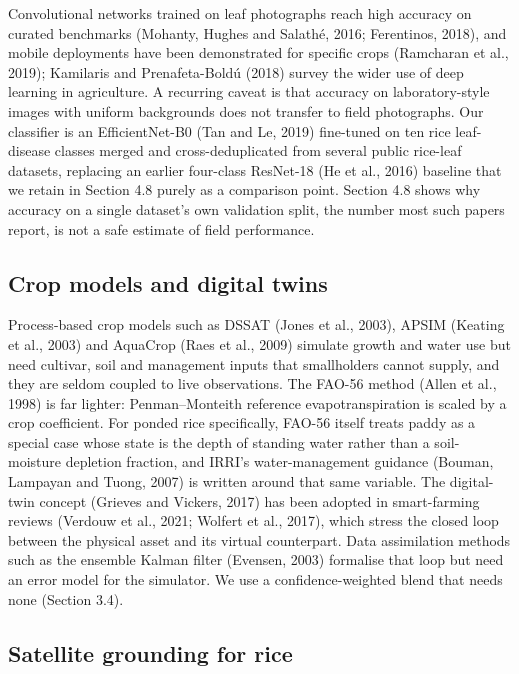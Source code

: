 \documentclass[11pt,a4paper]{article}
\begin{document}
Convolutional networks trained on leaf photographs reach high accuracy on curated benchmarks (Mohanty, Hughes and Salathé, 2016; Ferentinos, 2018), and mobile deployments have been demonstrated for specific crops (Ramcharan et al., 2019); Kamilaris and Prenafeta-Boldú (2018) survey the wider use of deep learning in agriculture. A recurring caveat is that accuracy on laboratory-style images with uniform backgrounds does not transfer to field photographs. Our classifier is an EfficientNet-B0 (Tan and Le, 2019) fine-tuned on ten rice leaf-disease classes merged and cross-deduplicated from several public rice-leaf datasets, replacing an earlier four-class ResNet-18 (He et al., 2016) baseline that we retain in Section 4.8 purely as a comparison point. Section 4.8 shows why accuracy on a single dataset's own validation split, the number most such papers report, is not a safe estimate of field performance.

\subsection{Crop models and digital twins}

Process-based crop models such as DSSAT (Jones et al., 2003), APSIM (Keating et al., 2003) and AquaCrop (Raes et al., 2009) simulate growth and water use but need cultivar, soil and management inputs that smallholders cannot supply, and they are seldom coupled to live observations. The FAO-56 method (Allen et al., 1998) is far lighter: Penman--Monteith reference evapotranspiration is scaled by a crop coefficient. For ponded rice specifically, FAO-56 itself treats paddy as a special case whose state is the depth of standing water rather than a soil-moisture depletion fraction, and IRRI's water-management guidance (Bouman, Lampayan and Tuong, 2007) is written around that same variable. The digital-twin concept (Grieves and Vickers, 2017) has been adopted in smart-farming reviews (Verdouw et al., 2021; Wolfert et al., 2017), which stress the closed loop between the physical asset and its virtual counterpart. Data assimilation methods such as the ensemble Kalman filter (Evensen, 2003) formalise that loop but need an error model for the simulator. We use a confidence-weighted blend that needs none (Section 3.4).

\subsection{Satellite grounding for rice}
\end{document}
